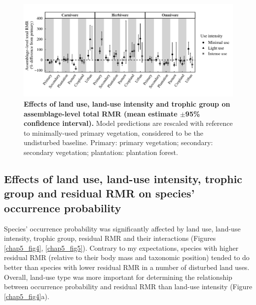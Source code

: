 \begin{figure}[h!]
\centering
\includegraphics[scale=0.75]{figures/Chapter5/Figure3}
\caption[Effects of land use, land-use intensity and trophic group on assemblage-level total RMR.]{\textbf{Effects of land use, land-use intensity and trophic group on assemblage-level total RMR (mean estimate $\pm$95\% confidence interval).} Model predictions are rescaled with reference to minimally-used primary vegetation, considered to be the undisturbed baseline. Primary: primary vegetation; secondary: secondary vegetation; plantation: plantation forest. }
\label{chap5_fig3}
\end{figure}


\subsection{Effects of land use, land-use intensity, trophic group and residual RMR on species’ occurrence probability}

Species’ occurrence probability was significantly affected by land use, land-use intensity, trophic group, residual RMR and their interactions (Figures \ref{chap5_fig4}, \ref{chap5_fig5}). Contrary to my expectations, species with higher residual RMR (relative to their body mass and taxonomic position) tended to do better than species with lower residual RMR in a number of disturbed land uses. Overall, land-use type was more important for determining the relationship between occurrence probability and residual RMR than land-use intensity (Figure \ref{chap5_fig4}a).

